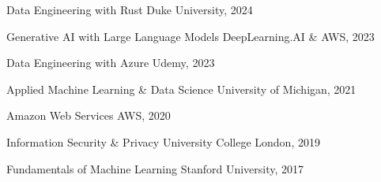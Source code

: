 
\begin{cventries}

	
	\vspace{-0.25cm}
    \cventry
    {}
    {\textnormal{Data Engineering with Rust}}
    {Duke University, 2024} %
    {} %
    {}

  	\vspace{-1cm}
    \cventry
    {}
    {\textnormal{Generative AI with Large Language Models}}
    {DeepLearning.AI \& AWS, 2023} %
    {} %
    {}
    
    \vspace{-1cm}
    \cventry
    {}
    {\textnormal{Data Engineering with Azure}}
    {Udemy, 2023}
    {}
    {}
    
    \vspace{-1cm}
    \cventry
    {}
    {\textnormal{Applied Machine Learning \& Data Science}}
    {University of Michigan, 2021}
    {}
    {}
    
    \vspace{-1cm}
    \cventry
    {}
    {\textnormal{Amazon Web Services}}
    {AWS, 2020}
    {}
    {}
    
    \vspace{-1cm}
    \cventry
    {}
    {\textnormal{Information Security \& Privacy}}
    {University College London, 2019}
    {}
    {}
    
    \vspace{-1cm}
    \cventry
    {}
    {\textnormal{Fundamentals of Machine Learning}}
    {Stanford University, 2017}
    {}
    {}
	
	\vspace{-1.3cm}
\end{cventries}
